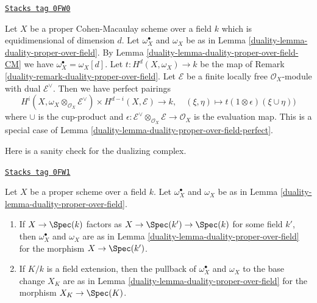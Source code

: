\begin{remark}
\label{duality-remark-rework-duality-locally-free-CM}
\href{https://stacks.math.columbia.edu/tag/0FW0}{\texttt{Stacks tag 0FW0}}

Let $X$ be a proper Cohen-Macaulay scheme over a field $k$
which is equidimensional of dimension $d$.
Let $\omega_X^\bullet$ and $\omega_X$ be as in
Lemma \ref{duality-lemma-duality-proper-over-field}.
By Lemma \ref{duality-lemma-duality-proper-over-field-CM}
we have $\omega_X^\bullet = \omega_X[d]$.
Let $t : H^d(X, \omega_X) \to k$ be the map of
Remark \ref{duality-remark-duality-proper-over-field}.
Let $\mathcal{E}$ be a finite locally free $\mathcal{O}_X$-module
with dual $\mathcal{E}^\vee$. Then we have perfect pairings
$$
H^i(X, \omega_X \otimes_{\mathcal{O}_X} \mathcal{E}^\vee)
\times
H^{d - i}(X, \mathcal{E})
\longrightarrow
k,\quad
(\xi, \eta) \longmapsto t(1 \otimes \epsilon)(\xi \cup \eta))
$$
where $\cup$ is the cup-product and
$\epsilon : \mathcal{E}^\vee \otimes_{\mathcal{O}_X} \mathcal{E}
\to \mathcal{O}_X$ is the evaluation map.
This is a special case of Lemma \ref{duality-lemma-duality-proper-over-field-perfect}.
\end{remark}

Here is a sanity check for the dualizing complex.

\begin{lemma}
\label{duality-lemma-sanity-check-duality}
\href{https://stacks.math.columbia.edu/tag/0FW1}{\texttt{Stacks tag 0FW1}}

Let $X$ be a proper scheme over a field $k$. Let $\omega_X^\bullet$ and
$\omega_X$ be as in Lemma \ref{duality-lemma-duality-proper-over-field}.
\begin{enumerate}
\item If $X \to \Spec(k)$ factors as $X \to \Spec(k') \to \Spec(k)$
for some field $k'$, then $\omega_X^\bullet$ and $\omega_X$
are as in Lemma \ref{duality-lemma-duality-proper-over-field} for the morphism
$X \to \Spec(k')$.
\item If $K/k$ is a field extension, then the pullback of
$\omega_X^\bullet$ and $\omega_X$ to the base change $X_K$
are as in  Lemma \ref{duality-lemma-duality-proper-over-field} for the morphism
$X_K \to \Spec(K)$.
\end{enumerate}
\end{lemma}

